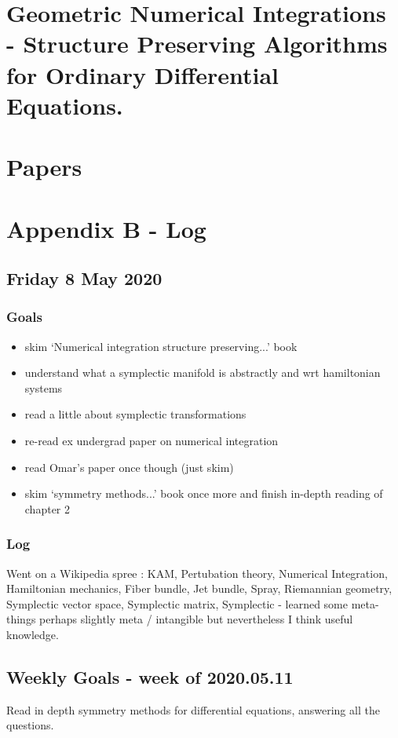 \documentclass[12pt]{article}
\begin{document}
\section{Geometric Numerical Integrations - Structure Preserving Algorithms for Ordinary Differential Equations.}

\section{Papers}

\section{Appendix B - Log}

\subsection{Friday 8 May 2020}
\subsubsection{Goals}
\begin{itemize}
    \item skim `Numerical integration structure preserving...' book
    \item understand what a symplectic manifold is abstractly and wrt hamiltonian systems
    \item read a little about symplectic transformations
    \item re-read ex undergrad paper on numerical integration
    \item read Omar's paper once though (just skim)
    \item skim `symmetry methods...' book once more and finish in-depth reading of chapter 2
\end{itemize}

\subsubsection{Log}
Went on a Wikipedia spree : KAM, Pertubation theory, Numerical Integration, Hamiltonian mechanics, Fiber bundle, Jet bundle, Spray, Riemannian geometry, Symplectic vector space, Symplectic matrix, Symplectic - learned some meta-things perhaps slightly meta / intangible but nevertheless I think useful knowledge. 


\subsection{Weekly Goals - week of 2020.05.11}
Read in depth symmetry methods for differential equations, answering all the questions. 
\end{document}
